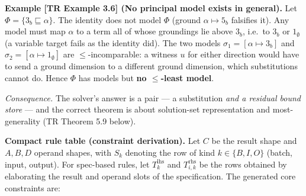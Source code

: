 \documentclass[
  10pt,
  letterpaper,
]{article}
\begin{document}
\textbf{Example {[}TR Example 3.6{]} (No principal model exists in
general).} Let \(\Phi = \{3_b \sqsubseteq \alpha\}\). The identity does
not model \(\Phi\) (ground \(\alpha \mapsto 5_b\) falsifies it). Any
model must map \(\alpha\) to a term all of whose groundings lie above
\(3_b\), i.e.~to \(3_b\) or \(1_\emptyset\) (a variable target fails as
the identity did). The two models \(\sigma_1 = [\alpha \mapsto 3_b]\)
and \(\sigma_2 = [\alpha \mapsto 1_\emptyset]\) are
\(\le\)-incomparable: a witness \(u\) for either direction would have to
send a ground dimension to a different ground dimension, which
substitutions cannot do. Hence \(\Phi\) has models but \textbf{no
\(\le\)-least model}.

\emph{Consequence.} The solver's answer is a pair --- a substitution
\emph{and a residual bound store} --- and the correct theorem is about
solution-set representation and most-generality (TR Theorem 5.9 below).

\textbf{Compact rule table (constraint derivation).} Let \(C\) be the
result shape and \(A,B,D\) operand shapes, with \(S_k\) denoting the row
of kind \(k \in \{B,I,O\}\) (batch, input, output). For spec-based
rules, let \(T^{\mathrm{lhs}}_k\) and \(T^{\mathrm{rhs}}_{i,k}\) be the
rows obtained by elaborating the result and operand slots of the
specification. The generated core constraints are:
\end{document}
